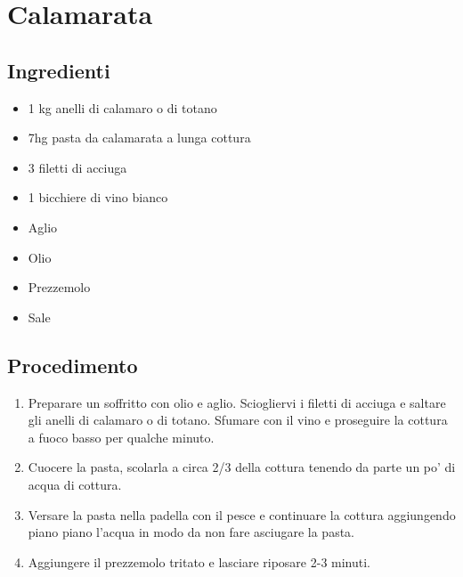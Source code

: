 \section{Calamarata}
\subsection{Ingredienti}
\begin{itemize}
\item 1 kg anelli di calamaro o di totano  
\item 7hg pasta da calamarata a lunga cottura  
\item 3 filetti di acciuga  
\item 1 bicchiere di vino bianco  
\item Aglio  
\item Olio  
\item Prezzemolo  
\item Sale
\end{itemize}
\subsection{Procedimento}
\begin{enumerate}
\item  Preparare un soffritto con olio e aglio. Sciogliervi i filetti di acciuga e saltare gli anelli di calamaro o di totano. Sfumare con il vino e proseguire la cottura a fuoco basso per qualche minuto.  
\item  Cuocere la pasta, scolarla a circa 2/3 della cottura tenendo da parte un po' di acqua di cottura.  
\item  Versare la pasta nella padella con il pesce e continuare la cottura aggiungendo piano piano l'acqua in modo da non fare asciugare la pasta.  
\item  Aggiungere il prezzemolo tritato e lasciare riposare 2-3 minuti.
\end{enumerate}
